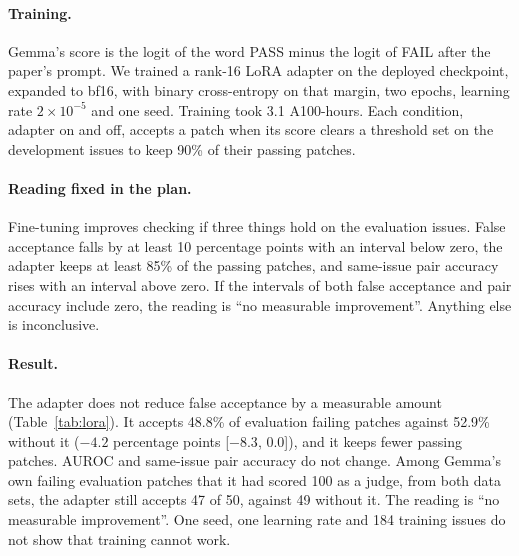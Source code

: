 \documentclass[10pt,letterpaper]{article}
\begin{document}
\paragraph{Training.} Gemma's score is the logit of the word PASS minus the logit of FAIL after the paper's prompt. We trained
a rank-16 LoRA adapter on the deployed checkpoint, expanded to bf16, with binary cross-entropy on that margin, two
epochs, learning rate $2 \times 10^{-5}$ and one seed. Training took 3.1 A100-hours. Each condition, adapter on and
off, accepts a patch when its score clears a threshold set on the development issues to keep 90\% of their passing
patches.

\paragraph{Reading fixed in the plan.} Fine-tuning improves checking if three things hold on the evaluation issues.
False acceptance falls by at least 10 percentage points with an interval below zero, the adapter keeps at least 85\%
of the passing patches, and same-issue pair accuracy rises with an interval above zero. If the intervals of both false acceptance and pair
accuracy include zero, the reading is ``no measurable improvement''. Anything else is inconclusive.

\paragraph{Result.} The adapter does not reduce false acceptance by a measurable amount (Table~\ref{tab:lora}). It
accepts 48.8\% of evaluation failing patches against 52.9\% without it ($-4.2$ percentage points [$-8.3$, 0.0]), and it keeps
fewer passing patches. AUROC and same-issue pair accuracy do not change. Among Gemma's own failing evaluation patches
that it had scored 100 as a judge, from both data sets, the adapter still accepts 47 of 50, against 49 without it.
The reading is ``no measurable improvement''. One seed, one learning rate and 184 training issues do not show that
training cannot work.
\end{document}
